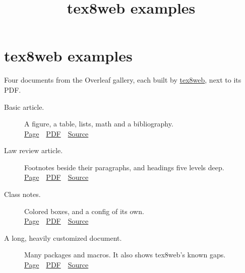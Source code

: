 \documentclass{article}
\title{tex8web examples}
\newcommand{\example}[1]{%
    \href{#1/main.html}{Page}\ \textperiodcentered\
    \href{#1/main.pdf}{PDF}\ \textperiodcentered\
    \href{https://github.com/justin-w-li/tex8web/tree/main/examples/#1}{Source}}
\begin{document}
\section*{tex8web examples}

Four documents from the Overleaf gallery, each built by
\href{https://github.com/justin-w-li/tex8web}{tex8web}, next to its PDF.

\begin{description}
    \item[Basic article.] A figure, a table, lists, math and a bibliography.\\
        \example{basic}
    \item[Law review article.] Footnotes beside their paragraphs, and headings
        five levels deep.\\
        \example{footnotes}
    \item[Class notes.] Colored boxes, and a config of its own.\\
        \example{custom}
    \item[A long, heavily customized document.] Many packages and macros. It
        also shows tex8web's known gaps.\\
        \example{complex}
\end{description}
\end{document}
